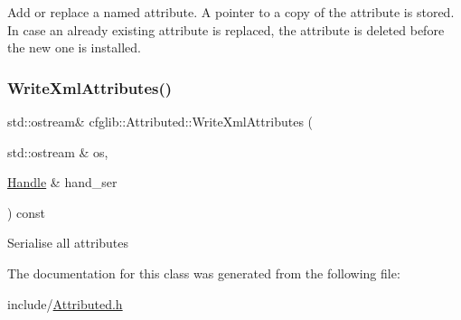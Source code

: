 Add or replace a named attribute. A pointer to a copy of the attribute is stored. In case an already existing attribute is replaced, the attribute is deleted before the new one is installed. \mbox{\label{classcfglib_1_1Attributed_af1cf65adeb481619018088533a7dc306}} 
\subsubsection{\texorpdfstring{Write\+Xml\+Attributes()}{WriteXmlAttributes()}}
{\footnotesize\ttfamily std\+::ostream\& cfglib\+::\+Attributed\+::\+Write\+Xml\+Attributes (\begin{DoxyParamCaption}\item[{std\+::ostream \&}]{os,  }\item[{\hyperlink{classcfglib_1_1Handle}{Handle} \&}]{hand\+\_\+ser }\end{DoxyParamCaption}) const}

Serialise all attributes 

The documentation for this class was generated from the following file\+:\begin{DoxyCompactItemize}
\item 
include/\hyperlink{Attributed_8h}{Attributed.\+h}\end{DoxyCompactItemize}
